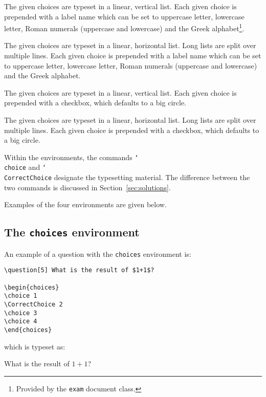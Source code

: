 \documentclass[12pt,a4paper]{exam}
\providecommand{\texorpdfstring}[2]{#1}
\newcommand{\bs}{\texorpdfstring{\char`\\}{}}
\begin{document}
\begin{description}[labelindent=2ex]
\item[\texttt{choices}] The given choices are typeset in a linear, vertical list.
Each given choice is prepended with a label name which can be set to uppercase
letter, lowercase letter, Roman numerals (uppercase and lowercase) and the Greek
alphabet\footnote{Provided by the \texttt{exam} document class.}.

\item[\texttt{oneparchoices}] The given choices are typeset in a linear, horizontal list.
Long lists are split over multiple lines.
Each given choice is prepended with a label name which can be set to uppercase
letter, lowercase letter, Roman numerals (uppercase and lowercase) and the Greek
alphabet.

\item[\texttt{checkboxes}] The given choices are typeset in a linear, vertical list.
Each given choice is prepended with a checkbox, which defaults to a big circle. 

\item[\texttt{oneparcheckboxes}] The given choices are typeset in a linear, horizontal
list. Long lists are split over multiple lines.
Each given choice is prepended with a checkbox, which defaults to a big circle.

\end{description}

 Within the environments, the
commands \texttt{\bs choice} and \texttt{\bs CorrectChoice} designate the
typesetting material. The difference between the two commands is discussed
in Section~\ref{sec:solutions}.

Examples of the four environments are given below.

\subsection{The \texttt{choices} environment}

An example of a question with the \texttt{choices} environment is:

\begin{lstlisting}
\question[5] What is the result of $1+1$?

\begin{choices}
\choice 1
\CorrectChoice 2
\choice 3
\choice 4
\end{choices}
\end{lstlisting}

which is typeset as:
\enlargethispage{\baselineskip}
\begin{questions}
\setcounter{question}{0}
\question[5] What is the result of $1+1$?

\begin{choices}
\end{choices}
\end{questions}
\end{document}
